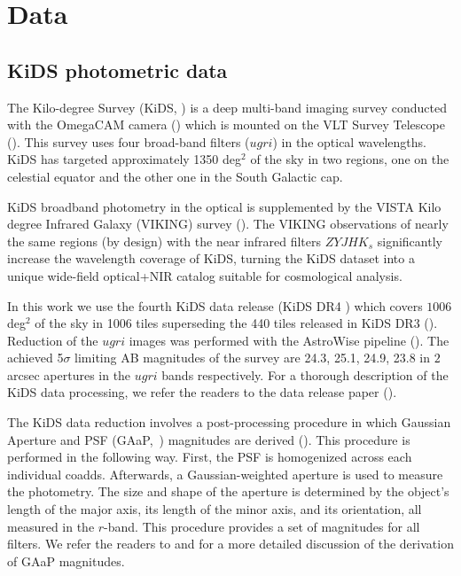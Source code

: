 \documentclass{aa}
\numberwithin{equation}{section}
\begin{document}
{\section{Data}\label{sec:data}

\subsection{KiDS photometric data}\label{sec:kids}

The Kilo-degree Survey (KiDS, \citealt{kids}) is a deep multi-band imaging survey conducted with the OmegaCAM camera (\citealt{omegacam}) which is mounted on the VLT Survey Telescope (\citealt{vst}). This survey uses four broad-band filters ($ugri$) in the optical wavelengths. KiDS has targeted approximately 1350 deg$^2$ of the sky in two regions, one on the celestial equator and the other one in the South Galactic cap. 

KiDS broadband photometry in the optical is supplemented by the VISTA Kilo degree Infrared Galaxy (VIKING) survey (\citealt{irwin2004,lewis2010,Edge2013,Gonz2018}). The VIKING observations of nearly the same regions (by design) with the near infrared filters $ZYJHK_{s}$ significantly increase the wavelength coverage of KiDS, turning the KiDS dataset into a unique wide-field optical+NIR catalog suitable for cosmological analysis.

In this work we use the fourth KiDS data release (KiDS DR4 \citealt{kuijken2019}) which covers $1006$ deg$^{2}$ of the sky in 1006 tiles superseding the 440 tiles released in KiDS DR3 (\citealt{kids_dr3}). Reduction of the $ugri$ images was performed with the AstroWise pipeline (\citealt{astrowise}).  
The achieved 5$\sigma$ limiting AB magnitudes of the survey are 24.3, 25.1, 24.9, 23.8 in $2$ arcsec apertures in the $ugri$ bands respectively. For a thorough description of the KiDS data processing, we refer the readers to the data release paper (\citealt{kuijken2019}). 


The KiDS data reduction involves a post-processing procedure in which Gaussian Aperture and PSF (GAaP,~\citealt{gaap}) magnitudes are derived (\citealt{kuijken2015}). This procedure is performed in the following way. First, the PSF is homogenized across each individual coadds. Afterwards, a Gaussian-weighted aperture is used to measure the photometry. The size and shape of the aperture is determined by the object's length of the major axis, its length of the minor axis, and its orientation, all measured in the $r$-band. This procedure provides a set of magnitudes for all filters. We refer the readers to \citet{kuijken2015} and \citet{kids_dr3} for a more detailed discussion of the derivation of GAaP magnitudes.

}
\end{document}

